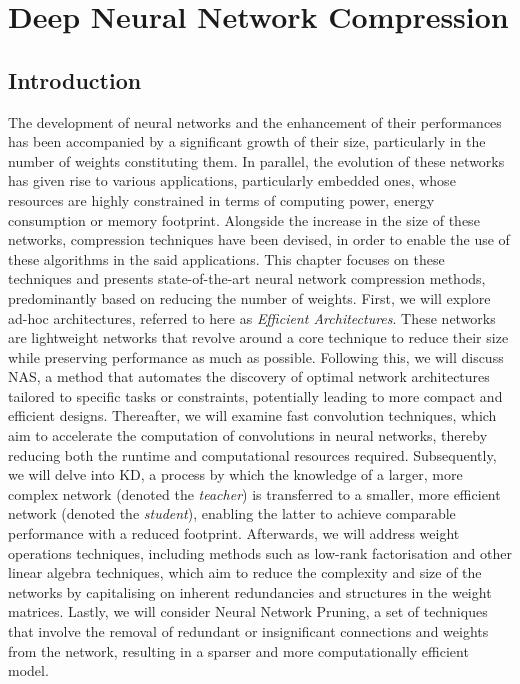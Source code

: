\chapter{Deep Neural Network Compression}
\label{chap:sota}


\localtableofcontents


\section{Introduction}
The development of neural networks and the enhancement of their performances has
been accompanied by a significant growth of their size, particularly in the
number of weights constituting them. In parallel, the evolution of these
networks has given rise to various applications, particularly embedded ones,
whose resources are highly constrained in terms of computing power, energy
consumption or memory footprint. Alongside the increase in the size of these
networks, compression techniques have been devised, in order to enable the use
of these algorithms in the said applications. This chapter focuses on these
techniques and presents state-of-the-art neural network compression methods,
predominantly based on reducing the number of weights. First, we will explore
ad-hoc architectures, referred to here as \emph{Efficient Architectures}. These
networks are lightweight networks that revolve around a core technique to reduce
their size while preserving performance as much as possible. Following this, we
will discuss \ac{NAS}, a method that automates the discovery of optimal network
architectures tailored to specific tasks or constraints, potentially leading to
more compact and efficient designs. Thereafter, we will examine fast convolution
techniques, which aim to accelerate the computation of convolutions in neural
networks, thereby reducing both the runtime and computational resources
required. Subsequently, we will delve into \ac{KD}, a process by which the
knowledge of a larger, more complex network (denoted the \emph{teacher}) is
transferred to a smaller, more efficient network (denoted the \emph{student}),
enabling the latter to achieve comparable performance with a reduced footprint.
Afterwards, we will address weight operations techniques, including methods such
as low-rank factorisation and other linear algebra techniques, which aim to
reduce the complexity and size of the networks by capitalising on inherent
redundancies and structures in the weight matrices. Lastly, we will consider
Neural Network Pruning, a set of techniques that involve the removal of
redundant or insignificant connections and weights from the network, resulting
in a sparser and more computationally efficient model.\\

